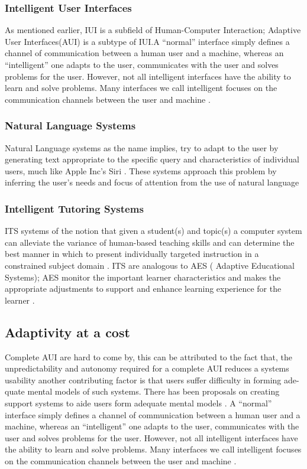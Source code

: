 \subsubsection{Intelligent User Interfaces}
As mentioned earlier, IUI is a subfield of Human-Computer Interaction; Adaptive User Interfaces(AUI) is a subtype of IUI.A ``normal'' interface simply defines a channel of communication between a human user and a machine, whereas an ``intelligent'' one adapts to the user, communicates with the user and solves problems for the user.
However, not all intelligent interfaces have the ability to learn and solve problems. Many interfaces we call intelligent focuses on the communication channels between the user and machine \cite{patrick2003intelligent}.
\subsubsection{Natural Language Systems}
Natural Language systems as the name implies, try to adapt to the user by generating text appropriate to the specific query and characteristics of individual users, much like Apple Inc's Siri \cite{website:SIRI}. These systems approach this problem by inferring the user's needs and focus of attention from the use of natural language \cite{benyon1993adaptive}
\subsubsection{Intelligent Tutoring Systems}
ITS systems of the notion that given a student(s) and topic(s) a computer system can alleviate the variance of human-based teaching skills and can determine the best manner in which to present individually targeted instruction in a constrained subject domain \cite{benyon1993adaptive}. ITS are analogous to AES ( Adaptive Educational Systems); AES monitor the important learner characteristics and makes the appropriate adjustments to support and enhance learning experience for the learner \cite{shute2012adaptive}.
\subsection{Adaptivity at a cost}
Complete AUI are hard to come by, this can be attributed to the fact that, the unpredictability and autonomy required for a complete AUI reduces a systems usability 
another contributing factor is that users suffer difficulty in forming ade- quate mental models of such systems. There has been proposals on creating support systems to aide users form adequate mental models \cite{paymans2004usability}. A ``normal'' interface simply defines a channel of communication between a human user and a machine, whereas an ``intelligent'' one adapts to the user, communicates with the user and solves problems for the user.
However, not all intelligent interfaces have the ability to learn and solve problems. Many interfaces we call intelligent focuses on the communication channels between the user and machine \cite{patrick2003intelligent}.
